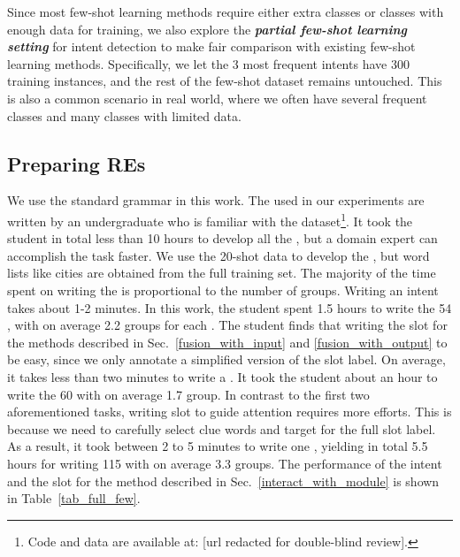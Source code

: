 Since most few-shot learning methods require either extra classes or classes with enough data for training, we also explore the
\textbf{\emph{partial few-shot learning setting}} for intent detection to make fair comparison with existing few-shot learning methods.
Specifically, we let the 3 most frequent intents have 300 training instances, and the rest of the few-shot dataset remains untouched.
This is also a common scenario in real world, where we often have several frequent classes and many classes with limited data.

\subsection{Preparing REs}
\label{re_in_exp} We use the standard \RE grammar in this work. The \REs used in our experiments are written by an undergraduate who is
familiar with the dataset\footnote{Code and data are available at: [url redacted for double-blind review].}.  It took the student in total
less than 10 hours to develop all the \REs, but a domain expert can accomplish the task faster. We use the 20-shot data to develop the
\REs, but word lists like cities are obtained from the full training set. The majority of the time spent on writing the \REs is
proportional to the number of \RE groups. Writing an intent \RE takes about 1-2 minutes. In this work, the student spent 1.5 hours to write
the 54 \REs, with on average 2.2 \RE groups for each \RE. The student finds that writing the slot \RE for the methods described in
Sec.~\ref{fusion_with_input} and \ref{fusion_with_output} to be easy, since we only annotate a simplified version of the slot label. On
average, it takes less than two minutes to write a \RE. It took the student about an hour to write the 60 \REs with on average 1.7 \RE
group. In contrast to the first two aforementioned tasks, writing slot \REs to guide attention requires more efforts. This is because we
need to carefully select clue words and target for the full slot label. As a result, it took between 2 to 5 minutes to write one \RE,
yielding in total 5.5 hours for writing 115 \REs with on average 3.3 \RE groups. The performance of the intent \REs and the slot \REs for
the method described in Sec.~\ref{interact_with_module} is shown in Table~\ref{tab_full_few}.


